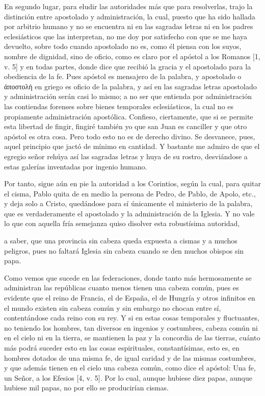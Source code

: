 En segundo lugar, para eludir las autoridades más que para resolverlas, trajo la distinción entre apostolado y administración, la cual, puesto que ha sido hallada por arbitrio humano y no se encuentra ni en las sagradas letras ni en los padres eclesiásticos que las interpretan, no me doy por satisfecho con que se me haya devuelto, sobre todo cuando apostolado no es, como él piensa con los suyos, nombre de dignidad, sino de oficio, como es claro por el apóstol a los Romanos [1, v. 5] y en todas partes, donde dice que recibió la gracia y el apostolado para la obediencia de la fe. Pues apóstol es mensajero de la palabra, y apostolado o ἀποστολή en griego es oficio de la palabra, y así en las sagradas letras apostolado y administración serán casi lo mismo; a no ser que entienda por administración las contiendas forenses sobre bienes temporales eclesiásticos, la cual no es propiamente administración apostólica. Confieso, ciertamente, que si se permite esta libertad de fingir, fingiré también yo que san Juan es canciller y que otro apóstol es otra cosa. Pero todo esto no es de derecho divino. Se desvanece, pues, aquel principio que jactó de mínimo en cantidad. Y bastante me admiro de que el egregio señor rehúya así las sagradas letras y huya de su rostro, desviándose a estas galerías inventadas por ingenio humano.

Por tanto, sigue aún en pie la autoridad a los Corintios, según la cual, para quitar el cisma, Pablo quita de en medio la persona de Pedro, de Pablo, de Apolo, etc., y deja solo a Cristo, quedándose para sí únicamente el ministerio de la palabra, que es verdaderamente el apostolado y la administración de la Iglesia. Y no vale lo que con aquella fría semejanza quiso disolver esta robustísima autoridad,

a saber, que una provincia sin cabeza queda expuesta a cismas y a muchos peligros, pues no faltará Iglesia sin cabeza cuando se den muchos obispos sin papa.

Como vemos que sucede en las federaciones, donde tanto más hermosamente se administran las repúblicas cuanto menos tienen una cabeza común, pues es evidente que el reino de Francia, el de España, el de Hungría y otros infinitos en el mundo existen sin cabeza común y sin embargo no chocan entre sí, contentándose cada reino con su rey. Y si en estas cosas temporales y fluctuantes, no teniendo los hombres, tan diversos en ingenios y costumbres, cabeza común ni en el cielo ni en la tierra, se mantienen la paz y la concordia de las tierras, cuánto \marginpar{\small[314]} más podrá suceder esto en las cosas espirituales, constantísimas, esto es, en hombres dotados de una misma fe, de igual caridad y de las mismas costumbres, y que además tienen en el cielo una cabeza común, como dice el apóstol: Una fe, un Señor, a los Efesios [4, v. 5]. Por lo cual, aunque hubiese diez papas, aunque hubiese mil papas, no por ello se producirían cismas.

